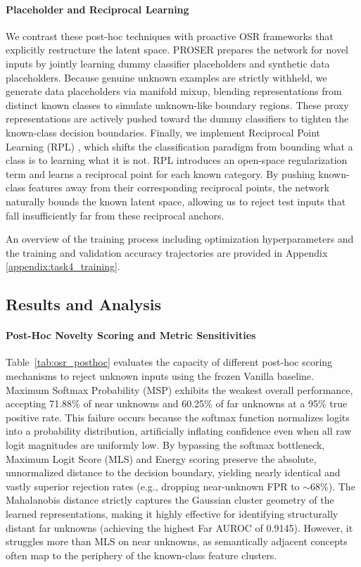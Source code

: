 \documentclass{article}
\begin{document}
\paragraph{Placeholder and Reciprocal Learning}
We contrast these post-hoc techniques with proactive OSR frameworks that explicitly restructure the latent space. PROSER \citep{Zhou_2021_CVPR} prepares the network for novel inputs by jointly learning dummy classifier placeholders and synthetic data placeholders. Because genuine unknown examples are strictly withheld, we generate data placeholders via manifold mixup, blending representations from distinct known classes to simulate unknown-like boundary regions. These proxy representations are actively pushed toward the dummy classifiers to tighten the known-class decision boundaries. Finally, we implement Reciprocal Point Learning (RPL) \citep{Chen2020}, which shifts the classification paradigm from bounding what a class is to learning what it is not. RPL introduces an open-space regularization term and learns a reciprocal point for each known category. By pushing known-class features away from their corresponding reciprocal points, the network naturally bounds the known latent space, allowing us to reject test inputs that fall insufficiently far from these reciprocal anchors.

An overview of the training process including optimization hyperparameters and the training and validation accuracy trajectories are provided in Appendix \ref{appendix:task4_training}.

\subsection{Results and Analysis}

\paragraph{Post-Hoc Novelty Scoring and Metric Sensitivities}
Table~\ref{tab:osr_posthoc} evaluates the capacity of different post-hoc scoring mechanisms to reject unknown inputs using the frozen Vanilla baseline. Maximum Softmax Probability (MSP) exhibits the weakest overall performance, accepting 71.88\% of near unknowns and 60.25\% of far unknowns at a 95\% true positive rate. This failure occurs because the softmax function normalizes logits into a probability distribution, artificially inflating confidence even when all raw logit magnitudes are uniformly low. By bypassing the softmax bottleneck, Maximum Logit Score (MLS) and Energy scoring preserve the absolute, unnormalized distance to the decision boundary, yielding nearly identical and vastly superior rejection rates (e.g., dropping near-unknown FPR to $\sim$68\%). The Mahalanobis distance strictly captures the Gaussian cluster geometry of the learned representations, making it highly effective for identifying structurally distant far unknowns (achieving the highest Far AUROC of 0.9145). However, it struggles more than MLS on near unknowns, as semantically adjacent concepts often map to the periphery of the known-class feature clusters.
\end{document}
